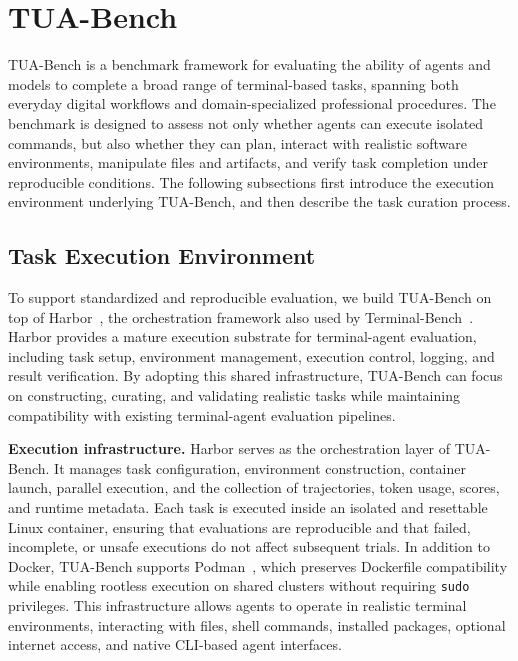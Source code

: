 \documentclass{llmxive}
\providecommand{\benchname}{\mbox{TUA-Bench}\xspace}
\begin{document}
\section{TUA-Bench}\label{sec:tua-bench}
TUA-Bench is a benchmark framework for evaluating the ability of agents and models to complete a broad range of terminal-based tasks, spanning both everyday digital workflows and domain-specialized professional procedures. The benchmark is designed to assess not only whether agents can execute isolated commands, but also whether they can plan, interact with realistic software environments, manipulate files and artifacts, and verify task completion under reproducible conditions. The following subsections first introduce the execution environment underlying TUA-Bench, and then describe the task curation process.

\subsection{Task Execution Environment}\label{sec:task-env}

To support standardized and reproducible evaluation, we build \benchname on top of Harbor~\citep{Harbor_Framework}, the orchestration framework also used by Terminal-Bench~\citep{merrill2026terminalbench}. Harbor provides a mature execution substrate for terminal-agent evaluation, including task setup, environment management, execution control, logging, and result verification. By adopting this shared infrastructure, \benchname can focus on constructing, curating, and validating realistic tasks while maintaining compatibility with existing terminal-agent evaluation pipelines.

\noindent\textbf{Execution infrastructure.}
Harbor serves as the orchestration layer of \benchname. It manages task configuration, environment construction, container launch, parallel execution, and the collection of trajectories, token usage, scores, and runtime metadata. Each task is executed inside an isolated and resettable Linux container, ensuring that evaluations are reproducible and that failed, incomplete, or unsafe executions do not affect subsequent trials. In addition to Docker, \benchname supports Podman~\citep{podman2026}, which preserves Dockerfile compatibility while enabling rootless execution on shared clusters without requiring \texttt{sudo} privileges. This infrastructure allows agents to operate in realistic terminal environments, interacting with files, shell commands, installed packages, optional internet access, and native CLI-based agent interfaces.
\end{document}

